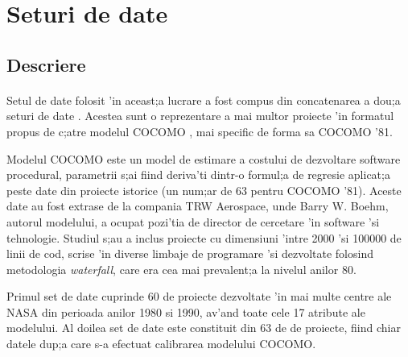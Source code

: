 \section {Seturi de date}

\subsection{Descriere}

\paragraph{}

Setul de date folosit 'in aceast;a lucrare a fost compus din concatenarea a dou;a seturi de date \cite{promise1, promise2}. Acestea sunt o reprezentare a mai multor proiecte 'in formatul propus de c;atre modelul COCOMO \cite{boehm}, mai specific de forma sa COCOMO '81. 
\par
Modelul COCOMO este un model de estimare a costului de dezvoltare software procedural, parametrii s;ai fiind deriva'ti dintr-o formul;a de regresie aplicat;a peste date din proiecte istorice (un num;ar de 63 pentru COCOMO '81). Aceste date au fost extrase de la compania TRW Aerospace, unde Barry W. Boehm, autorul modelului, a ocupat pozi'tia de director de cercetare 'in software 'si tehnologie. Studiul s;au a inclus proiecte cu dimensiuni 'intre 2000 'si 100000 de linii de cod, scrise 'in diverse limbaje de programare 'si dezvoltate folosind metodologia \textit{waterfall}, care era cea mai prevalent;a la nivelul anilor 80.
\par
Primul set de date cuprinde 60 de proiecte dezvoltate 'in mai multe centre ale NASA din perioada anilor 1980 si 1990, av'and toate cele 17 atribute ale modelului. Al doilea set de date este constituit din 63 de de proiecte, fiind chiar datele dup;a care s-a efectuat calibrarea modelului COCOMO.

